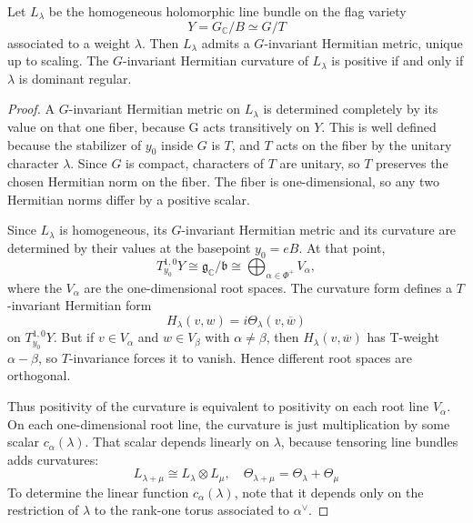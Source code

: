 \documentclass[12pt]{article}
\begin{document}
\begin{proposition}
Let \(L_\lambda\) be the homogeneous holomorphic line bundle on the flag variety
\[
Y=G_{\mathbb C}/B \simeq G/T
\]
associated to a weight \(\lambda\). Then $L_\lambda$ admits a \(G\)-invariant Hermitian metric, unique up to scaling. The \(G\)-invariant Hermitian curvature of \(L_\lambda\) is positive if and only if \(\lambda\) is dominant regular.
\end{proposition}

\begin{proof}
    A $G$-invariant Hermitian metric on $L_\lambda$ is determined completely by its value on that one fiber, because G acts transitively on $Y$. This is well defined because the stabilizer of $y_0$ inside $G$ is $T$, and $T$ acts on the fiber by the unitary character $\lambda$. Since $G$ is compact, characters of $T$ are unitary, so $T$ preserves the chosen Hermitian norm on the fiber. The fiber is one-dimensional, so any two Hermitian norms differ by a positive scalar.

Since \(L_\lambda\) is homogeneous, its \(G\)-invariant Hermitian metric and its curvature are determined by their values at the basepoint \(y_0=eB\). At that point,
\[
T_{y_0}^{1,0}Y \cong \mathfrak g_{\mathbb C}/\mathfrak b
\cong \bigoplus_{\alpha\in\Phi^+} V_\alpha,
\]
where the \(V_\alpha\) are the one-dimensional root spaces. The curvature form defines a \(T\)-invariant Hermitian form
\[
H_\lambda(v,w)=i\Theta_\lambda(v,\overline{w})
\]
on \(T_{y_0}^{1,0}Y\). But if $v\in V_\alpha$ and $w\in V_\beta$ with $\alpha\neq \beta$, then $H_\lambda(v,\overline{w})$ has T-weight $\alpha-\beta$, so $T$-invariance forces it to vanish. Hence different root spaces are orthogonal.

Thus positivity of the curvature is equivalent to positivity on each root line \(V_\alpha\). On each one-dimensional root line, the curvature is just multiplication by some scalar $c_\alpha(\lambda)$. That scalar depends linearly on $\lambda$, because tensoring line bundles adds curvatures:
\[
L_{\lambda+\mu}\cong L_\lambda\otimes L_\mu, \quad
\Theta_{\lambda+\mu}=\Theta_\lambda+\Theta_\mu
\] To determine the linear function $c_\alpha(\lambda)$, note that it depends only on the restriction of $\lambda$ to the rank-one torus associated to $\alpha^\vee$.


\end{proof}
\end{document}
